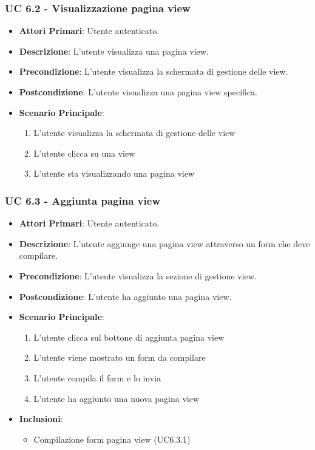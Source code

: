 			\subsubsection{UC 6.2 - Visualizzazione pagina view}
			\begin{itemize}
				\item \textbf{Attori Primari}: Utente autenticato.
				\item \textbf{Descrizione}: L'utente visualizza una pagina view.
				\item \textbf{Precondizione}: L'utente visualizza la schermata di gestione delle view.
				\item \textbf{Postcondizione}: L'utente visualizza una pagina view specifica.
				\item \textbf{Scenario Principale}:
				\begin{enumerate}
					\item{L'utente visualizza la schermata di gestione delle view}
					\item{L'utente clicca su una view}
					\item{L'utente sta visualizzando una pagina view}
				\end{enumerate}	
			\end{itemize}

			\subsubsection{UC 6.3 - Aggiunta pagina view}
			\begin{itemize}
				\item \textbf{Attori Primari}: Utente autenticato.
				\item \textbf{Descrizione}: L'utente aggiunge una pagina view attraverso un form che deve compilare.
				\item \textbf{Precondizione}: L'utente visualizza la sezione di gestione view.
				\item \textbf{Postcondizione}: L'utente ha aggiunto una pagina view.
				\item \textbf{Scenario Principale}:
				\begin{enumerate}
					\item{L'utente clicca sul bottone di aggiunta pagina view}
					\item{L'utente viene mostrato un form da compilare}
					\item{L'utente compila il form e lo invia}
					\item{L'utente ha aggiunto una nuova pagina view}
				\end{enumerate}	
				\item \textbf{Inclusioni}:
				\begin{itemize}
					\item Compilazione form pagina view (UC6.3.1)
				\end{itemize}
			\end{itemize}

